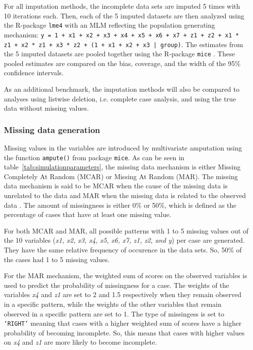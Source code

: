 \documentclass[10pt, a4paper, titlepage]{article}
\begin{document}
For all imputation methods, the incomplete data sets are imputed 5 times with 10 iterations each. Then, each of the 5 imputed datasets are then analyzed using the R-package \texttt{lme4} \citep{bates2015} with an MLM reflecting the population generating mechanism: \texttt{y = 1 + x1 + x2 + x3 + x4 + x5 + x6 + x7 + z1 + z2 + x1 * z1 + x2 * z1 + x3 * z2 + (1 + x1 + x2 + x3 | group)}. The estimates from the 5 imputed datasets are pooled together using the R-package \texttt{mice} \citep{buuren2011}. These pooled estimates are compared on the bias, coverage, and the width of the 95\% confidence intervals.

As an additional benchmark, the imputation methods will also be compared to analyses using listwise deletion, i.e. complete case analysis, and using the true data without missing values.

\subsubsection{Missing data generation}
Missing values in the variables are introduced by multivariate amputation using the function \texttt{ampute()} \citep{schouten2018} from package \texttt{mice}. As can be seen in table~\ref{tab:simulationparameters}, the missing data mechanism is either Missing Completely At Random (MCAR) or Missing At Random (MAR). The missing data mechanism is said to be MCAR when the cause of the missing data is unrelated to the data and MAR when the missing data is related to the observed data \citep{rubin1976}. The amount of missingness is either 0\% or 50\%, which is defined as the percentage of cases that have at least one missing value. 

For both MCAR and MAR, all possible patterns with 1 to 5 missing values out of the 10 variables (\textit{x1, x2, x3, x4, x5, x6, x7, z1, z2, and y}) per case are generated. They have the same relative frequency of occurence in the data sets. So, 50\% of the cases had 1 to 5 missing values. 

For the MAR mechanism, the weighted sum of scores on the observed variables is used to predict the probability of missingness for a case. The weights of the variables \textit{x4} and \textit{z1} are set to 2 and 1.5 respectively when they remain observed in a specific pattern, while the weights of the other variables that remain observed in a specific pattern are set to 1. The type of missingess is set to \texttt{`RIGHT'} meaning that cases with a higher weighted sum of scores have a higher probability of becoming incomplete. So, this means that cases with higher values on \textit{x4} and \textit{z1} are more likely to become incomplete.
\end{document}
